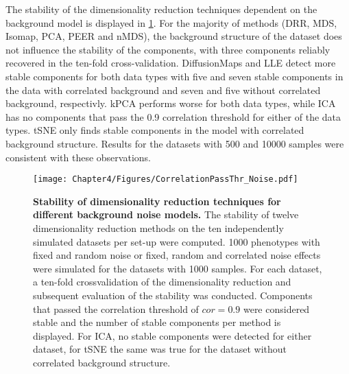 The stability of the dimensionality reduction techniques dependent on the background model is displayed in \cref{fig:cor-noise}. For the majority of methods (DRR, MDS, Isomap, PCA, PEER and nMDS), the background structure of the dataset does not influence the stability of the components, with three components reliably recovered in the ten-fold cross-validation. DiffusionMaps and LLE detect more stable components for both data types with five and seven stable components in the data with correlated background and seven and five without correlated background, respectivly. kPCA performs worse for both data types, while ICA has no components that pass the \num{0.9} correlation threshold for either of the data types. tSNE only finds stable components in the model with correlated background structure.  Results for the datasets with \num{500} and \num{10000} samples were consistent with these observations.

\begin{figure}[hbtp]
	\centering
	\texttt{[image: Chapter4/Figures/CorrelationPassThr\_Noise.pdf]}
	\caption[\textbf{Stability of dimensionality reduction techniques for different background noise models.}]{\textbf{Stability of dimensionality reduction techniques for different background noise models. }The stability of twelve dimensionality reduction methods on the ten independently simulated datasets per set-up were computed. \num{1000} phenotypes with fixed and random noise or fixed, random and correlated noise effects were simulated for the datasets with \numlist{1000} samples. For each dataset, a ten-fold crossvalidation of the dimensionality reduction and subsequent evaluation of the stability was conducted. Components that passed the correlation threshold of \(cor=0.9\) were considered stable and the number of stable components per method is displayed. For ICA, no stable components were detected for either dataset, for tSNE the same was true for the dataset without correlated background structure.} 
	 	\label{fig:cor-noise}
\end{figure}

